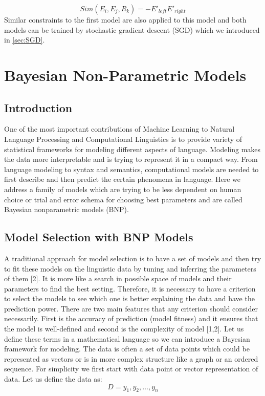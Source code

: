    \begin{equation}
    \label{eq:dot} Sim(E_{i}, E_{j}, R_{k}) = -E'_{left}E'_{right}
   \end{equation}
    Similar constraints to the first model are also applied to this model and 
     both models can be trained by stochastic gradient descent (SGD) which we
     introduced in \autoref{sec:SGD}.

\section{Bayesian Non-Parametric Models}
\label {sec:bnp}

\subsection{Introduction}
\label{ssec:intro}
One of the most important contributions of Machine Learning to Natural Language
Processing and Computational Linguistics is to provide variety of statistical frameworks for modeling
 different aspects of language. Modeling makes the data more interpretable and is trying to represent 
 it in a compact way. From language modeling to syntax and semantics, 
 computational models are needed to first describe and then predict the certain phenomena in language. 
 Here we address a family of models which are trying to be less dependent on human choice or 
 trial and error schema for choosing best parameters and are called Bayesian nonparametric models (BNP).
 
\subsection{Model Selection with BNP Models}
\label{ssec:model-sel}
A traditional approach for model selection is to have a set of models and then try to fit 
these models on the linguistic data by tuning and inferring the parameters of them [2]. 
It is more like a search in possible space of models and their parameters to find the best setting. 
Therefore, it is necessary to have a criterion to select the models to see which one is better 
explaining the data and have the prediction power. There are two main features that any criterion 
should consider necessarily. First is the accuracy of prediction (model fitness) and it ensures that 
the model is well-defined and second is the complexity of model [1,2]. 
Let us define these terms in a mathematical language so we can introduce a Bayesian framework for modeling. 
The data is often a set of data points which could be represented as vectors or is in more 
complex structure like a graph or an ordered sequence. For simplicity we first start with 
data point or vector representation of data. Let us define the data as:
\begin{equation}
\label{eq:data}
D = y_1,y_2,\ldots,y_n
\end{equation}


